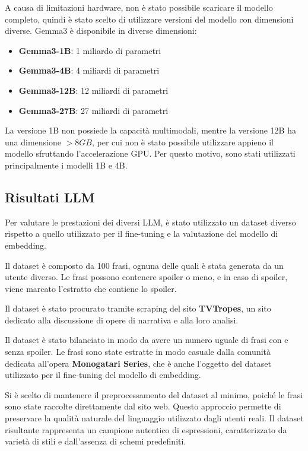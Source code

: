A causa di limitazioni hardware, non è stato possibile
scaricare il modello completo, quindi è stato scelto di
utilizzare versioni del modello con dimensioni diverse.
Gemma3 è disponibile in diverse dimensioni:

\begin{itemize}
  \item \textbf{Gemma3-1B}: 1 miliardo di parametri
  \item \textbf{Gemma3-4B}: 4 miliardi di parametri
  \item \textbf{Gemma3-12B}: 12 miliardi di parametri
  \item \textbf{Gemma3-27B}: 27 miliardi di parametri
\end{itemize}

La versione 1B non possiede la capacità multimodali, mentre
la versione 12B ha una dimensione $>8GB$, per cui non è
stato possibile utilizzare appieno il modello sfruttando
l'accelerazione GPU.
Per questo motivo, sono stati utilizzati principalmente i
modelli 1B e 4B.

\subsection{Risultati LLM}
\label{sec:llm_results}

Per valutare le prestazioni dei diversi LLM, è stato
utilizzato un dataset diverso rispetto a quello utilizzato
per il fine-tuning e la valutazione del modello di
embedding.

Il dataset è composto da 100 frasi, ognuna delle quali è
stata generata da un utente diverso.
Le frasi possono contenere spoiler o meno, e in caso di
spoiler, viene marcato l'estratto che contiene lo spoiler.

Il dataset è stato procurato tramite scraping del sito
\textbf{TVTropes}, un sito dedicato alla discussione di
opere di narrativa e alla loro analisi.

Il dataset è stato bilanciato in modo da avere un numero
uguale di frasi con e senza spoiler.
Le frasi sono state estratte in modo casuale dalla comunità
dedicata all'opera \textbf{Monogatari Series}, che è anche
l'oggetto del dataset utilizzato per il fine-tuning del
modello di embedding.

Si è scelto di mantenere il preprocessamento del dataset al
minimo, poiché le frasi sono state raccolte direttamente
dal sito web.
Questo approccio permette di preservare la qualità naturale
del linguaggio utilizzato dagli utenti reali.
Il dataset risultante rappresenta un campione autentico di
espressioni, caratterizzato da varietà di stili e
dall'assenza di schemi predefiniti.

